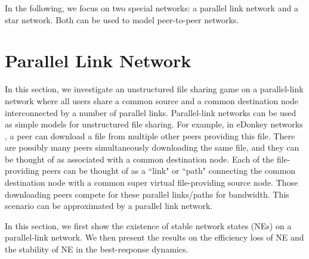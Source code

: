 \documentclass[conference]{IEEEtran}
\begin{document}

In the following, we focus on two special networks: a parallel
link network and a star network. Both can be used to model
peer-to-peer networks.


%

\section{Parallel Link Network}\label{sec:para}


In this section, we investigate an unstructured file sharing game
on a parallel-link network where all users share a common source
and a common destination node interconnected by a number of
parallel links.
Parallel-link networks can be used as simple models for
unstructured file sharing. For example, in eDonkey networks
\cite{p2p}, a peer can download a file from multiple other peers
providing this file. There are possibly many peers simultaneously
downloading the same file, and they can be thought of as
associated with a common destination node. Each of the
file-providing peers can be thought of as a ``link" or ``path"
connecting the common destination node with a common super virtual
file-providing source node. Those downloading peers compete for
these parallel links/paths for bandwidth. This scenario can be
approximated by a parallel link network.



In this section, we first show the existence of stable network
states (NEs) on a parallel-link network. We then present the
results on the efficiency loss of NE and the stability of NE in
the best-response dynamics.
\end{document}

